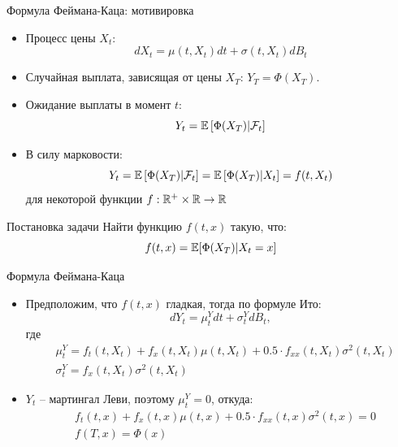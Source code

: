 \documentclass[aspectratio=169]{beamer}
\begin{document}
\begin{frame}{Формула Феймана-Каца: мотивировка}
    \begin{itemize}
        \item Процесс цены $X_t$:
        $$
            dX_t = \mu(t, X_t) dt + \sigma(t, X_t) dB_t
        $$
        \item Случайная выплата, зависящая от цены $X_T$: $Y_T = \Phi(X_T)$.
        \item Ожидание выплаты в момент $t$:
        $$
            Y_t = \mathbb{E} \left[ \Phi(X_T) | \mathcal{F}_t \right]
        $$
        \item В силу марковости:
        $$
            Y_t = \mathbb{E} \left[ \Phi(X_T) | \mathcal{F}_t \right] = \mathbb{E} \left[ \Phi(X_T) | X_t \right] = f(t, X_t)
        $$для некоторой функции $f : \mathbb{R}^+\times \mathbb{R} \to \mathbb{R}$
    \end{itemize}

    \begin{block}{Постановка задачи}
        Найти функцию $f(t,x)$ такую, что:
        $$
            f(t, x) = \mathbb{E}[\Phi(X_T) | X_t=x]
        $$
    \end{block}

\end{frame}

\begin{frame}{Формула Феймана-Каца}
    \begin{itemize}
        \item Предположим, что $f(t, x)$ гладкая, тогда по формуле Ито:
        $$
            dY_t = \mu^Y_t dt + \sigma^Y_t dB_t,
        $$где \noident
        \begin{align*}
            &\mu^Y_t = f_t(t, X_t) + f_x(t, X_t) \mu(t, X_t) + 0.5 \cdot f_{xx}(t, X_t) \sigma^2(t,X_t) \\
            &\sigma_t^Y = f_x(t, X_t) \sigma^2(t, X_t) 
        \end{align*}
        \item $Y_t$ -- мартингал Леви, поэтому $\mu^Y_t = 0$, откуда:\noident
        \begin{align*}
            &f_t(t, x) + f_x(t, x) \mu(t, x) + 0.5 \cdot f_{xx}(t, x) \sigma^2(t, x) = 0 \\
            &f(T, x) = \Phi(x)
        \end{align*}
    \end{itemize}
\end{frame}
\end{document}
